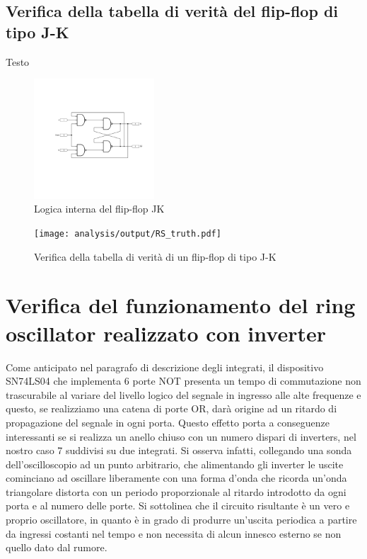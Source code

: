 \documentclass[journal]{IEEEtran}
\begin{document}
\subsection{Verifica della tabella di verità del flip-flop di tipo J-K}
Testo

\begin{figure}[H]%
\centering
\begin{center}
\includegraphics[width=0.40\textwidth]{sch-simulations/digital/output/flip-flop-JK.pdf}
\end{center}
\caption{Logica interna del flip-flop JK}
\label{fig:circuit_JK}
\end{figure}

\begin{figure}[H]%
\begin{center}
\texttt{[image: analysis/output/RS\_truth.pdf]}
\caption{Verifica della tabella di verità di un flip-flop di tipo J-K}
\label{fig:graph_ring_oscillator}
\end{center}
\end{figure}


\section{Verifica del funzionamento del ring oscillator realizzato con inverter}
Come anticipato nel paragrafo di descrizione degli integrati, il dispositivo SN74LS04 che implementa 6 porte NOT presenta un tempo di commutazione non trascurabile al variare del livello logico del segnale in ingresso alle alte frequenze e questo, se realizziamo una catena di porte OR, darà origine ad un ritardo di propagazione del segnale in ogni porta. 
Questo effetto porta a conseguenze interessanti se si realizza un anello chiuso con un numero dispari di inverters, nel nostro caso 7 suddivisi su due integrati. Si osserva infatti, collegando una sonda dell'oscilloscopio ad un punto arbitrario, che alimentando gli inverter le uscite cominciano ad oscillare liberamente con una forma d'onda che ricorda un'onda triangolare distorta con un periodo proporzionale al ritardo introdotto da ogni porta e al numero delle porte. Si sottolinea che il circuito risultante è un vero e proprio oscillatore, in quanto è in grado di produrre un'uscita periodica a partire da ingressi costanti nel tempo e non necessita di alcun innesco esterno se non quello dato dal rumore.
\end{document}
